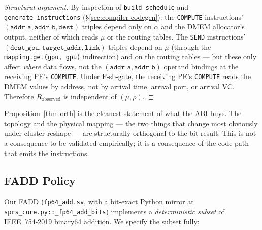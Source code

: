 \documentclass[journal,10pt]{IEEEtran}
\theoremstyle{plain}
\theoremstyle{definition}
\theoremstyle{remark}
\newenvironment{structuralargument}{\begin{proof}[Structural argument]}{\end{proof}}
\newcommand{\sv}[1]{\texttt{#1}}
\newcommand{\asgn}{\ensuremath{\alpha}}
\newcommand{\map}{\ensuremath{\mu}}
\begin{document}
\begin{structuralargument}
By inspection of \sv{build\_schedule} and \sv{generate\_instructions}
(\S\ref{sec:compiler-codegen}): the \texttt{COMPUTE} instructions'
$(\texttt{addr\_a}, \texttt{addr\_b}, \texttt{dest})$ triples depend only
on $\asgn$ and the DMEM allocator's output, neither of which reads
$\map$ or the routing tables. The \texttt{SEND} instructions'
$(\texttt{dest\_gpu}, \texttt{target\_addr}, \texttt{link})$ triples
depend on $\map$ (through the \sv{mapping.get(gpu, gpu)} indirection)
and on the routing tables --- but these only affect \emph{where} data
flows, not the $(\texttt{addr\_a}, \texttt{addr\_b})$ operand bindings at
the receiving PE's \texttt{COMPUTE}. Under \textsf{F-sb-gate}, the
receiving PE's \texttt{COMPUTE} reads the DMEM values by address, not by
arrival time, arrival port, or arrival VC. Therefore $R_\mathrm{observed}$
is independent of $(\map, \rho)$.
\end{structuralargument}

Proposition~\ref{thm:orth} is the cleanest statement of what the ABI buys.
The topology and the physical mapping --- the two things that change
most obviously under cluster reshape --- are structurally orthogonal to
the bit result. This is not a consequence to be validated empirically;
it is a consequence of the code path that emits the instructions.

\subsection{FADD Policy}\label{sec:fadd}

Our FADD (\sv{fp64\_add.sv}, with a bit-exact Python mirror at
\sv{sprs\_core.py::\_fp64\_add\_bits}) implements a \emph{deterministic
subset} of IEEE~754-2019 binary64 addition. We specify the subset fully:
\end{document}
